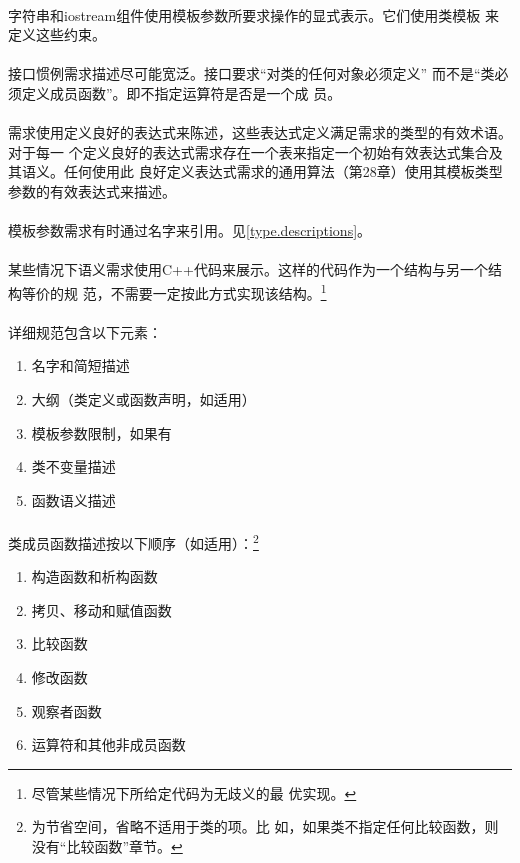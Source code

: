 \paragraph{}
字符串和iostream组件使用模板参数所要求操作的显式表示。它们使用类模板
来定义这些约束。

\paragraph{}
接口惯例需求描述尽可能宽泛。接口要求“对类的任何对象必须定义”
而不是“类必须定义成员函数”。即不指定运算符是否是一个成
员。

\paragraph{}
需求使用定义良好的表达式来陈述，这些表达式定义满足需求的类型的有效术语。对于每一
个定义良好的表达式需求存在一个表来指定一个初始有效表达式集合及其语义。任何使用此
良好定义表达式需求的通用算法（第28章）使用其模板类型参数的有效表达式来描述。

\paragraph{}
模板参数需求有时通过名字来引用。见\ref{type.descriptions}。

\paragraph{}
某些情况下语义需求使用C++代码来展示。这样的代码作为一个结构与另一个结构等价的规
范，不需要一定按此方式实现该结构。\footnote{尽管某些情况下所给定代码为无歧义的最
优实现。}

\paragraph{}
详细规范包含以下元素：
\begin{enumerate}
  \item{名字和简短描述}
  \item{大纲（类定义或函数声明，如适用）}
  \item{模板参数限制，如果有}
  \item{类不变量描述}
  \item{函数语义描述}
\end{enumerate}

\paragraph{}
类成员函数描述按以下顺序（如适用）：\footnote{为节省空间，省略不适用于类的项。比
如，如果类不指定任何比较函数，则没有“比较函数”章节。}
\begin{enumerate}
  \item{构造函数和析构函数}
  \item{拷贝、移动和赋值函数}
  \item{比较函数}
  \item{修改函数}
  \item{观察者函数}
  \item{运算符和其他非成员函数}
\end{enumerate}

